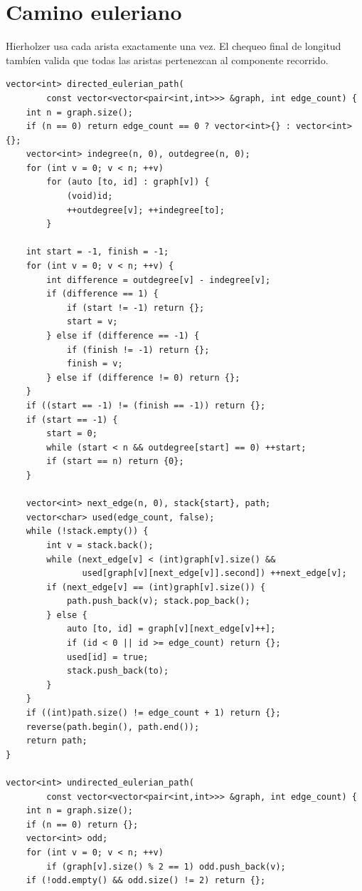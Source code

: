 \section{Camino euleriano}

Hierholzer usa cada arista exactamente una vez. El chequeo final de longitud
tamb\'ien valida que todas las aristas pertenezcan al componente recorrido.


\begin{lstlisting}[style=cpp]
vector<int> directed_eulerian_path(
        const vector<vector<pair<int,int>>> &graph, int edge_count) {
    int n = graph.size();
    if (n == 0) return edge_count == 0 ? vector<int>{} : vector<int>{};
    vector<int> indegree(n, 0), outdegree(n, 0);
    for (int v = 0; v < n; ++v)
        for (auto [to, id] : graph[v]) {
            (void)id;
            ++outdegree[v]; ++indegree[to];
        }

    int start = -1, finish = -1;
    for (int v = 0; v < n; ++v) {
        int difference = outdegree[v] - indegree[v];
        if (difference == 1) {
            if (start != -1) return {};
            start = v;
        } else if (difference == -1) {
            if (finish != -1) return {};
            finish = v;
        } else if (difference != 0) return {};
    }
    if ((start == -1) != (finish == -1)) return {};
    if (start == -1) {
        start = 0;
        while (start < n && outdegree[start] == 0) ++start;
        if (start == n) return {0};
    }

    vector<int> next_edge(n, 0), stack{start}, path;
    vector<char> used(edge_count, false);
    while (!stack.empty()) {
        int v = stack.back();
        while (next_edge[v] < (int)graph[v].size() &&
               used[graph[v][next_edge[v]].second]) ++next_edge[v];
        if (next_edge[v] == (int)graph[v].size()) {
            path.push_back(v); stack.pop_back();
        } else {
            auto [to, id] = graph[v][next_edge[v]++];
            if (id < 0 || id >= edge_count) return {};
            used[id] = true;
            stack.push_back(to);
        }
    }
    if ((int)path.size() != edge_count + 1) return {};
    reverse(path.begin(), path.end());
    return path;
}

vector<int> undirected_eulerian_path(
        const vector<vector<pair<int,int>>> &graph, int edge_count) {
    int n = graph.size();
    if (n == 0) return {};
    vector<int> odd;
    for (int v = 0; v < n; ++v)
        if (graph[v].size() % 2 == 1) odd.push_back(v);
    if (!odd.empty() && odd.size() != 2) return {};


\end{lstlisting}
